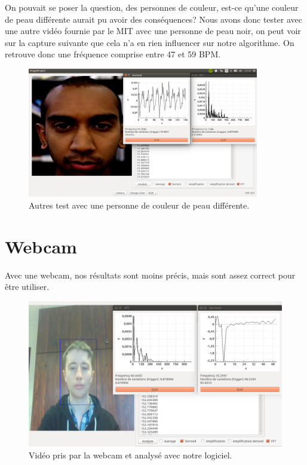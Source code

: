 On pouvait se poser la question, des personnes de couleur, est-ce qu'une couleur de peau différente aurait pu avoir des conséquences? Nous avons
donc tester avec une autre vidéo fournie par le MIT avec une personne de peau noir, on peut voir sur la capture suivante que cela n'a en rien influencer
sur notre algorithme. On retrouve donc une fréquence comprise entre 47 et 59 BPM\@.

\begin{figure}[h!]
	\centering
	\includegraphics[width=0.9\textwidth]{data/logi.png}
	\caption{Autres test avec une personne de couleur de peau différente.}
\end{figure}


\section{Webcam}

Avec une webcam, nos résultats sont moins précis, mais sont assez correct pour être utiliser. 

\begin{figure}[h!]
	\centering
	\includegraphics[width=1\textwidth]{data/webcam.png}
	\caption{Vidéo pris par la webcam et analysé avec notre logiciel.}
\end{figure}

